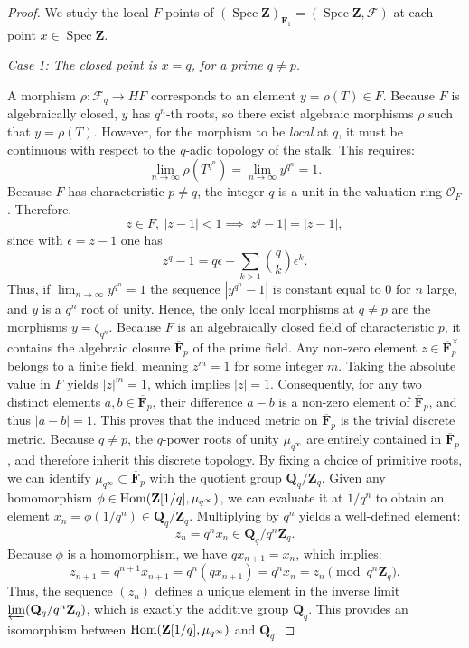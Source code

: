\documentclass[11pt,a4paper]{article}
\newcommand{\Q}{\mathbf{Q}}
\newcommand{\Z}{\mathbf{Z}}
\def\spz{\Spec \Z}
\def\spzf{(\Spec \Z)_{\mathbf{F}_{1}}}
\newcommand{\Hom}{{\rm{Hom}}}
\newcommand{\Spec}{\operatorname{Spec}}
\begin{document}
\begin{proof} We study the local $F$-points of $\spzf=(\spz,\mathcal F)$ at each  point $x \in \spz$.\vspace{.03in}



\emph{Case 1: The closed point is $x = q$, for a prime $q \neq p$.} 

A morphism $\rho: \mathcal{F}_q \to HF$ corresponds to an element $y = \rho(T) \in F$. Because $F$ is algebraically closed, $y$ has $q^n$-th roots, so there exist algebraic morphisms $\rho$ such that $y = \rho(T)$. 
However, for the morphism to be \emph{local} at $q$, it must be continuous with respect to the $q$-adic topology of the stalk. This requires:
\[ 
\lim_{n \to \infty} \rho(T^{q^n}) = \lim_{n \to \infty} y^{q^n} = 1. 
\]
Because $F$ has characteristic $p\neq q$, the integer $q$ is a unit in the valuation ring $\mathcal{O}_F$. Therefore, 
$$
z\in F, \ |z - 1| < 1\implies |z^q - 1| = |z - 1|,
$$
since with $\epsilon=z-1$ one has
$$
z^q - 1=q \epsilon +\sum_{k>1} \binom{q}{k}\epsilon^k.
$$
Thus, if $\lim_{n \to \infty} y^{q^n} = 1$ the sequence $|y^{q^n} - 1|$ is constant equal to $0$ for $n$ large, and $y$ is a $q^n$ root of unity. 
Hence, the only local morphisms at $q \neq p$ are the morphisms $y = \zeta_{q^n}$. Because $F$ is an algebraically closed field of characteristic $p$, it contains the algebraic closure $\overline{\mathbf F}_p$ of the prime field. Any non-zero element $z \in \overline{\mathbf F}_p^\times$ belongs to a finite field, meaning $z^m = 1$ for some integer $m$. Taking the absolute value in $F$ yields $|z|^m = 1$, which implies $|z| = 1$. Consequently, for any two distinct elements $a, b \in \overline{\mathbf F}_p$, their difference $a - b$ is a non-zero element of $\overline{\mathbf F}_p$, and thus $|a - b| = 1$. This proves that the induced metric on $\overline{\mathbf F}_p$ is the trivial discrete metric. Because $q \neq p$, the $q$-power roots of unity $\mu_{q^\infty}$ are entirely contained in $\overline{\mathbf F}_p$, and therefore inherit this discrete topology. By fixing a choice of primitive roots, we can identify $\mu_{q^\infty}\subset \overline{\mathbf F}_p$ with the quotient group $\Q_q/\Z_q$. 
Given any homomorphism $\phi \in \Hom(\Z[1/q], \mu_{q^\infty})$, we can evaluate it at $1/q^n$ to obtain an element $x_n = \phi(1/q^n) \in \Q_q/\Z_q$. Multiplying by $q^n$ yields a well-defined element:
\[ z_n = q^n x_n \in \Q_q / q^n \Z_q. 
\]
Because $\phi$ is a homomorphism, we have $q x_{n+1} = x_n$, which implies:
\[ 
z_{n+1} = q^{n+1} x_{n+1} = q^n (q x_{n+1}) = q^n x_n = z_n \pmod{q^n \Z_q}. 
\]
Thus, the sequence $(z_n)$ defines a unique element in the inverse limit $\varprojlim (\Q_q / q^n \Z_q)$, which is exactly the additive group $\Q_q$. This provides an isomorphism between $\Hom(\Z[1/q], \mu_{q^\infty})$ and $\Q_q$.


\end{proof}
\end{document}
